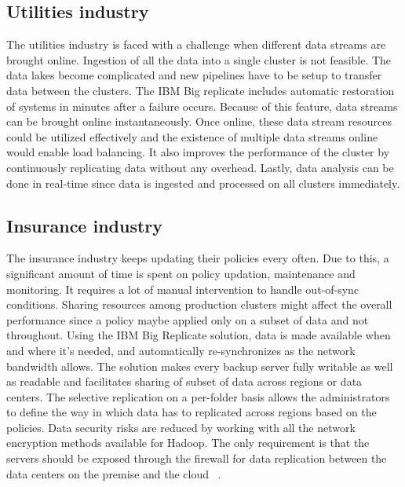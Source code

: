 \subsection{Utilities industry}
The utilities industry is faced with a challenge when different data streams are
brought online. Ingestion of all the data into a single cluster is not feasible.
The data lakes become complicated and new pipelines have to be setup to transfer
data between the clusters. The IBM Big replicate includes automatic restoration
of systems in minutes after a failure occurs. Because of this feature, data 
streams can be brought online instantaneously. Once online, these data stream
resources could be utilized effectively and the existence of multiple data 
streams online would enable load balancing. It also improves the performance
of the cluster by continuously replicating data without any overhead. Lastly,
data analysis can be done in real-time since data is ingested and processed on 
all clusters immediately.

\subsection{Insurance industry}
The insurance industry keeps updating their policies every often. Due to this, a
significant amount of time is spent on policy updation, maintenance and
monitoring. It requires a lot of manual intervention to handle out-of-sync 
conditions. Sharing resources among production clusters might affect the overall
performance since a policy maybe applied only on a subset of data and not 
throughout. Using the IBM Big Replicate solution, data is made available when 
and where it's needed, and automatically re-synchronizes as the network
bandwidth allows. The solution makes every backup server fully writable as well
as readable and facilitates sharing of subset of data across regions or data 
centers. The selective replication on a per-folder basis allows the 
administrators to define the way in which data has to replicated across regions
based on the policies. Data security risks are reduced by working with all the 
network encryption methods available for Hadoop. The only requirement is that
the servers should be exposed through the firewall for data replication between
the data centers on the premise and the cloud
~\cite{hid-sp18-408-IBMBigReplicate-intro}.

